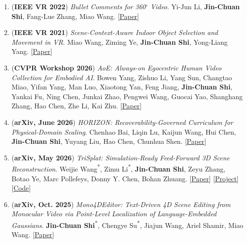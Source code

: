 \documentclass[10pt,a4paper]{article}
\newcommand{\pl}[2]{[\href{#2}{#1}]}
\newcommand{\me}{\textbf{Jin-Chuan Shi}}
\newcommand{\eq}{\textsuperscript{*}}
\begin{document}
\begin{enumerate}[label=\arabic*.,leftmargin=1.9em,labelsep=0.4em,itemsep=3pt,topsep=3pt]
  \item (\textbf{IEEE VR 2022})
        \textit{Bullet Comments for 360$^\circ$ Video}.
        Yi-Jun Li, \me, Fang-Lue Zhang, Miao Wang.
        \pl{Paper}{https://ieeexplore.ieee.org/abstract/document/9756782}

  \item (\textbf{IEEE VR 2021})
        \textit{Scene-Context-Aware Indoor Object Selection and Movement in VR}.
        Miao Wang, Ziming Ye, \me, Yong-Liang Yang.
        \pl{Paper}{https://ieeexplore.ieee.org/document/9417774}

  \item (\textbf{CVPR Workshop 2026})
        \textit{AoE: Always-on Egocentric Human Video Collection for Embodied AI}.
        Bowen Yang, Zishuo Li, Yang Sun, Changtao Miao, Yifan Yang, Man Luo, Xiaotong Yan, Feng Jiang, \me, Yankai Fu, Ning Chen, Junkai Zhao, Pengwei Wang, Guocai Yao, Shanghang Zhang, Hao Chen, Zhe Li, Kai Zhu.
        \pl{Paper}{https://arxiv.org/abs/2602.23893}

  \item (\textbf{arXiv, June 2026})
        \textit{HORIZON: Recoverability-Governed Curriculum for Physical-Domain Scaling}.
        Chenhao Bai, Liqin Lu, Kaijun Wang, Hui Chen, \me, Yuyang Liu, Hao Chen, Chunhua Shen.
        \pl{Paper}{https://arxiv.org/abs/2606.05143}

  \item (\textbf{arXiv, May 2026})
        \textit{TriSplat: Simulation-Ready Feed-Forward 3D Scene Reconstruction}.
        Weijie Wang\eq, Zimu Li\eq, \me, Zeyu Zhang, Botao Ye, Marc Pollefeys, Donny Y. Chen, Bohan Zhuang.
        \pl{Paper}{https://arxiv.org/abs/2605.26115} \pl{Project}{https://lhmd.top/trisplat} \pl{Code}{https://github.com/ziplab/TriSplat}

  \item (\textbf{arXiv, Oct. 2025})
        \textit{Mono4DEditor: Text-Driven 4D Scene Editing from Monocular Video via Point-Level Localization of Language-Embedded Gaussians}.
        \me\eq, Chengye Su\eq, Jiajun Wang, Ariel Shamir, Miao Wang.
        \pl{Paper}{https://arxiv.org/abs/2510.09438}
\end{enumerate}
\end{document}
